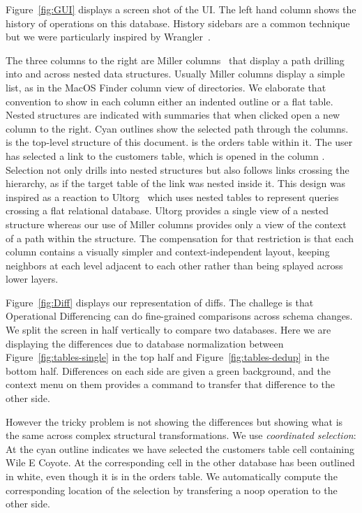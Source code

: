 \documentclass[english,submission]{programming}
\theoremstyle{definition}
\begin{document}
Figure~\ref{fig:GUI} displays a screen shot of the UI.  The left hand column shows the history of operations on this database. History sidebars are a common technique but we were particularly inspired by Wrangler~\cite{kandel11}.

The three columns to the right are Miller columns~\cite{miller-columns} that display a path drilling into and across nested data structures. Usually Miller columns display a simple list, as in the MacOS Finder column view of directories. We elaborate that convention to show in each column either an indented outline or a flat table. Nested structures are indicated with summaries that when clicked open a new column to the right. Cyan outlines show the selected path through the columns.  is the top-level structure of this document.  is the \textsf{orders} table within it. The user has selected a link to the \textsf{customers} table, which is opened in the column . Selection not only drills into nested structures but also follows links crossing the hierarchy, as if the target table of the link was nested inside it. This design was inspired as a reaction to Ultorg~\cite{bakke:phdthesis, ultorg} which uses nested tables to represent queries crossing a flat relational database. Ultorg provides a single view of a nested structure whereas our use of Miller columns provides only a view of the context of a path within the structure. The compensation for that restriction is that each column contains a visually simpler and context-independent layout, keeping neighbors at each level adjacent to each other rather than being splayed across lower layers.

Figure~\ref{fig:Diff} displays our representation of diffs. The challege is that Operational Differencing can do fine-grained comparisons across schema changes. We split the screen in half vertically to compare two databases. Here we are displaying the differences due to database normalization between Figure~\ref{fig:tables-single} in the top half and Figure~\ref{fig:tables-dedup} in the bottom half. Differences on each side are given a green background, and the context menu on them provides a command to transfer that difference to the other side.

However the tricky problem is not showing the differences but showing what is the same across complex structural transformations.
We use \textit{coordinated selection}:  At  the cyan outline indicates we have selected the \textsf{customers} table cell containing \textsf{Wile E Coyote}. At  the corresponding cell in the other database has been outlined in white, even though it is in the \textsf{orders} table. We automatically compute the corresponding location of the selection by transfering a \textsf{noop} operation to the other side.
\end{document}
